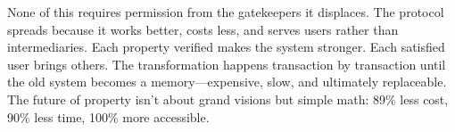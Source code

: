 None of this requires permission from the gatekeepers it displaces. The protocol spreads because it works better, costs less, and serves users rather than intermediaries. Each property verified makes the system stronger. Each satisfied user brings others. The transformation happens transaction by transaction until the old system becomes a memory—expensive, slow, and ultimately replaceable. The future of property isn't about grand visions but simple math: 89\% less cost, 90\% less time, 100\% more accessible.